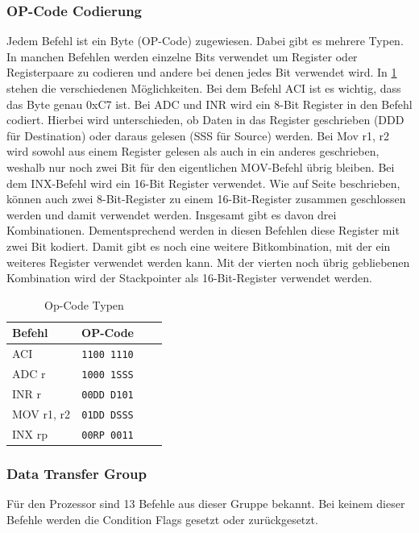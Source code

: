 \documentclass[12pt]{article}
\begin{document}
\subsubsection{OP-Code Codierung}
\label{chapter:opcode}
Jedem Befehl ist ein Byte (OP-Code) zugewiesen. Dabei gibt es mehrere Typen. In manchen Befehlen werden einzelne Bits verwendet um Register oder Registerpaare zu codieren und andere bei denen jedes Bit verwendet wird. In \ref{table:opcode} stehen die verschiedenen Möglichkeiten. Bei dem Befehl ACI ist es wichtig, dass das Byte genau 0xC7 ist. Bei ADC und INR wird ein 8-Bit Register in den Befehl codiert. Hierbei wird unterschieden, ob Daten in das Register geschrieben (DDD für Destination) oder daraus gelesen (SSS für Source) werden. Bei Mov r1, r2 wird sowohl aus einem Register gelesen als auch in ein anderes geschrieben, weshalb nur noch zwei Bit für den eigentlichen MOV-Befehl übrig bleiben. Bei dem INX-Befehl wird ein 16-Bit Register verwendet. Wie auf Seite \pageref{RegisterSection} beschrieben, können auch zwei 8-Bit-Register zu einem 16-Bit-Register zusammen geschlossen werden und damit verwendet werden. Insgesamt gibt es davon drei Kombinationen. Dementsprechend werden in diesen Befehlen diese Register mit zwei Bit kodiert. Damit gibt es noch eine weitere Bitkombination, mit der ein weiteres Register verwendet werden kann. Mit der vierten noch übrig gebliebenen Kombination wird der Stackpointer als 16-Bit-Register verwendet werden. 

\begin{table}[h]
\centering
\caption{Op-Code Typen}
\label{table:opcode}
\begin{tabular}{|l|c|c|c| } 
 \hline
 Befehl & OP-Code \\
 \hline 
 ACI & \texttt{1100 1110} \\ 
 ADC r & \texttt{1000 1SSS} \\
 INR r & \texttt{00DD D101} \\
 MOV r1, r2 & \texttt{01DD DSSS} \\
 INX rp & \texttt{00RP 0011} \\
 \hline
\end{tabular}
\end{table}

\subsubsection{Data Transfer Group}
Für den Prozessor sind 13 Befehle aus dieser Gruppe bekannt. Bei keinem dieser Befehle werden die Condition Flags gesetzt oder zurückgesetzt.
\end{document}
